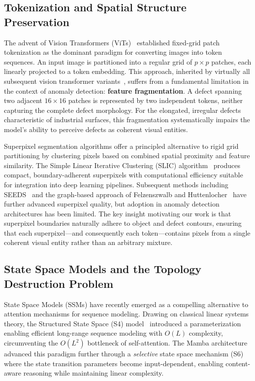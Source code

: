 \documentclass[lettersize,journal]{IEEEtran}
\begin{document}
\subsection{Tokenization and Spatial Structure Preservation}

The advent of Vision Transformers (ViTs)~\cite{dosovitskiy2021vit} established fixed-grid patch tokenization as the dominant paradigm for converting images into token sequences. An input image is partitioned into a regular grid of $p \times p$ patches, each linearly projected to a token embedding. This approach, inherited by virtually all subsequent vision transformer variants~\cite{liu2021swin,dong2022cswin}, suffers from a fundamental limitation in the context of anomaly detection: \textbf{feature fragmentation}. A defect spanning two adjacent $16 \times 16$ patches is represented by two independent tokens, neither capturing the complete defect morphology. For the elongated, irregular defects characteristic of industrial surfaces, this fragmentation systematically impairs the model's ability to perceive defects as coherent visual entities.

Superpixel segmentation algorithms offer a principled alternative to rigid grid partitioning by clustering pixels based on combined spatial proximity and feature similarity. The Simple Linear Iterative Clustering (SLIC) algorithm~\cite{achanta2012slic} produces compact, boundary-adherent superpixels with computational efficiency suitable for integration into deep learning pipelines. Subsequent methods including SEEDS~\cite{bergh2015seeds} and the graph-based approach of Felzenszwalb and Huttenlocher~\cite{felzenszwalb2004graph} have further advanced superpixel quality, but adoption in anomaly detection architectures has been limited. The key insight motivating our work is that superpixel boundaries naturally adhere to object and defect contours, ensuring that each superpixel---and consequently each token---contains pixels from a single coherent visual entity rather than an arbitrary mixture.

\subsection{State Space Models and the Topology Destruction Problem}

State Space Models (SSMs) have recently emerged as a compelling alternative to attention mechanisms for sequence modeling. Drawing on classical linear systems theory, the Structured State Space (S4) model~\cite{gu2022s4} introduced a parameterization enabling efficient long-range sequence modeling with $O(L)$ complexity, circumventing the $O(L^2)$ bottleneck of self-attention. The Mamba architecture~\cite{gu2023mamba} advanced this paradigm further through a \textit{selective} state space mechanism (S6) where the state transition parameters become input-dependent, enabling content-aware reasoning while maintaining linear complexity.
\end{document}
